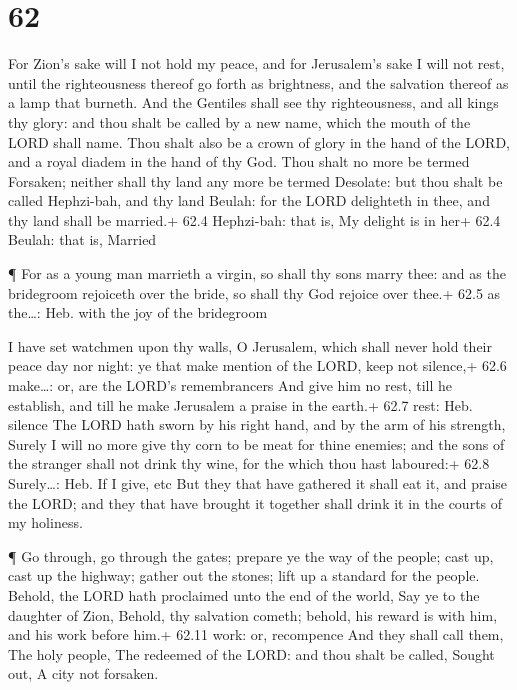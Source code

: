 \hypertarget{section-61}{%
\section{62}\label{section-61}}

 For Zion's sake will I not hold my peace, and for
Jerusalem's sake I will not rest, until the righteousness thereof go
forth as brightness, and the salvation thereof as a lamp that burneth.
 And the Gentiles shall see thy righteousness, and all kings
thy glory: and thou shalt be called by a new name, which the mouth of
the LORD shall name.  Thou shalt also be a crown of glory in
the hand of the LORD, and a royal diadem in the hand of thy God.
 Thou shalt no more be termed Forsaken; neither shall thy
land any more be termed Desolate: but thou shalt be called Hephzi-bah,
and thy land Beulah: for the LORD delighteth in thee, and thy land shall
be married.+ 62.4 Hephzi-bah: that is, My delight is in her+ 62.4
Beulah: that is, Married

 ¶ For as a young man marrieth a virgin, so shall thy sons
marry thee: and as the bridegroom rejoiceth over the bride, so shall thy
God rejoice over thee.+ 62.5 as the\ldots: Heb. with the joy of the
bridegroom

 I have set watchmen upon thy walls, O Jerusalem, which
shall never hold their peace day nor night: ye that make mention of the
LORD, keep not silence,+ 62.6 make\ldots: or, are the LORD's
remembrancers  And give him no rest, till he establish, and
till he make Jerusalem a praise in the earth.+ 62.7 rest: Heb. silence
 The LORD hath sworn by his right hand, and by the arm of
his strength, Surely I will no more give thy corn to be meat for thine
enemies; and the sons of the stranger shall not drink thy wine, for the
which thou hast laboured:+ 62.8 Surely\ldots: Heb. If I give, etc
 But they that have gathered it shall eat it, and praise the
LORD; and they that have brought it together shall drink it in the
courts of my holiness.

 ¶ Go through, go through the gates; prepare ye the way of
the people; cast up, cast up the highway; gather out the stones; lift up
a standard for the people.  Behold, the LORD hath
proclaimed unto the end of the world, Say ye to the daughter of Zion,
Behold, thy salvation cometh; behold, his reward is with him, and his
work before him.+ 62.11 work: or, recompence  And they
shall call them, The holy people, The redeemed of the LORD: and thou
shalt be called, Sought out, A city not forsaken.


